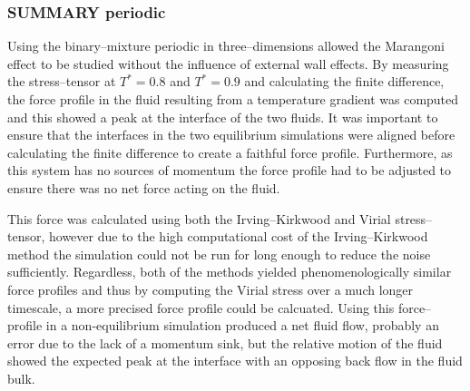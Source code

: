 \subsubsection{SUMMARY periodic}
Using the binary--mixture periodic in three--dimensions allowed the Marangoni effect to be studied without the influence of external wall effects.
By measuring the stress--tensor at $T^{*}=0.8$ and $T^{*}=0.9$ and calculating the finite difference, the force profile in the fluid resulting from a temperature gradient was computed and this showed a peak at the interface of the two fluids.
It was important to ensure that the interfaces in the two equilibrium simulations were aligned before calculating the finite difference to create a faithful force profile.
Furthermore, as this system has no sources of momentum the force profile had to be adjusted to ensure there was no net force acting on the fluid.

This force was calculated using both the Irving--Kirkwood and Virial stress--tensor, however due to the high computational cost of the Irving--Kirkwood method the simulation could not be run for long enough to reduce the noise sufficiently.
Regardless, both of the methods yielded phenomenologically similar force profiles and thus by computing the Virial stress over a much longer timescale, a more precised force profile could be calcuated.
Using this force--profile in a non-equilibrium simulation produced a net fluid flow, probably an error due to the lack of a momentum sink, but the relative motion of the fluid showed the expected peak at the interface with an opposing back flow in the fluid bulk.
